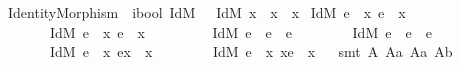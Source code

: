 \begin{isabellebody}
%
\isadelimproof
%
\endisadelimproof
\isanewline
\isanewline
\isanewline
{}\isamarkupfalse%
\ IdentityMorphism\ {\isacharcolon}{\isacharcolon}\ {\isachardoublequoteopen}i{\isasymRightarrow}bool{\isachardoublequoteclose}\ {\isacharparenleft}{\isachardoublequoteopen}IdM{\isacharunderscore}{\isachardoublequoteclose}\ {\isacharbrackleft}{}{}{}{\isacharbrackright}{}{}{\isacharparenright}\ \ {\isachardoublequoteopen}IdM\ x\ {\isasymequiv}\ x\ {\isasymapprox}\ {\isacharparenleft}{\isasymbox}x{\isacharparenright}{\isachardoublequoteclose}\isanewline
\isanewline
{}\isamarkupfalse%
\ {\isachardoublequoteopen}{\isacharparenleft}IdM\ e\ \isactrlbold {\isasymleftrightarrow}\ {\isacharparenleft}\isactrlbold {\isasymexists}x{\isachardot}\ e\ {\isasymapprox}\ {\isacharparenleft}{\isasymbox}x{\isacharparenright}{\isacharparenright}{\isacharparenright}\ \isactrlbold {\isasymand}\isanewline
\ \ \ \ \ \ \ {\isacharparenleft}IdM\ e\ \isactrlbold {\isasymleftrightarrow}\ {\isacharparenleft}\isactrlbold {\isasymexists}x{\isachardot}\ e\ {\isasymapprox}\ {\isacharparenleft}x{\isasymbox}{\isacharparenright}{\isacharparenright}{\isacharparenright}\ \isactrlbold {\isasymand}\ \isanewline
\ \ \ \ \ \ \ {\isacharparenleft}IdM\ e\ \isactrlbold {\isasymleftrightarrow}\ e\ {\isasymapprox}\ {\isacharparenleft}{\isasymbox}e{\isacharparenright}{\isacharparenright}\ \isactrlbold {\isasymand}\isanewline
\ \ \ \ \ \ \ {\isacharparenleft}IdM\ e\ \isactrlbold {\isasymleftrightarrow}\ e\ {\isasymapprox}\ {\isacharparenleft}e{\isasymbox}{\isacharparenright}{\isacharparenright}\ \isactrlbold {\isasymand}\isanewline
\ \ \ \ \ \ \ {\isacharparenleft}IdM\ e\ \isactrlbold {\isasymleftrightarrow}\ {\isacharparenleft}\isactrlbold {\isasymforall}x{\isachardot}\ e{\isasymcdot}x\ {\isasymgreaterapprox}\ x{\isacharparenright}{\isacharparenright}\ \isactrlbold {\isasymand}\isanewline
\ \ \ \ \ \ \ {\isacharparenleft}IdM\ e\ \isactrlbold {\isasymleftrightarrow}\ {\isacharparenleft}\isactrlbold {\isasymforall}x{\isachardot}\ x{\isasymcdot}e\ {\isasymgreaterapprox}\ x{\isacharparenright}{\isacharparenright}{\isachardoublequoteclose}\isanewline
%
\isadelimproof
\ %
\endisadelimproof
%
\isatagproof
{}\isamarkupfalse%
\ {\isacharparenleft}smt\ A{}\ A{}a\ A{}a\ A{}b{\isacharparenright}%
\endisatagproof
{\isafoldproof}%
%
\isadelimproof
\isanewline
%
\endisadelimproof
%
\isadelimtheory
%
\endisadelimtheory
%
\isatagtheory
{}\isamarkupfalse%
%
\endisatagtheory
{\isafoldtheory}%
%
\isadelimtheory
%
\endisadelimtheory
\end{isabellebody}%
